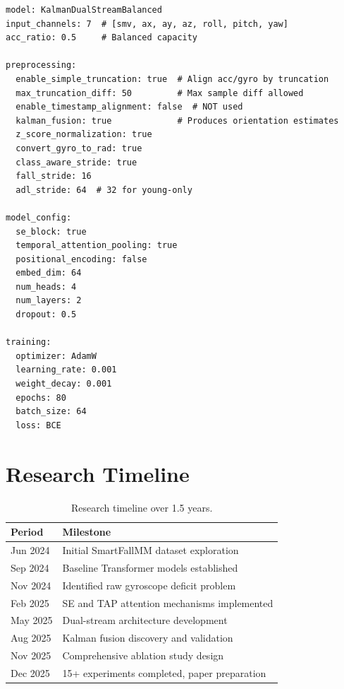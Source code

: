 \documentclass{article}
\begin{document}
\begin{verbatim}
model: KalmanDualStreamBalanced
input_channels: 7  # [smv, ax, ay, az, roll, pitch, yaw]
acc_ratio: 0.5     # Balanced capacity

preprocessing:
  enable_simple_truncation: true  # Align acc/gyro by truncation
  max_truncation_diff: 50         # Max sample diff allowed
  enable_timestamp_alignment: false  # NOT used
  kalman_fusion: true             # Produces orientation estimates
  z_score_normalization: true
  convert_gyro_to_rad: true
  class_aware_stride: true
  fall_stride: 16
  adl_stride: 64  # 32 for young-only

model_config:
  se_block: true
  temporal_attention_pooling: true
  positional_encoding: false
  embed_dim: 64
  num_heads: 4
  num_layers: 2
  dropout: 0.5

training:
  optimizer: AdamW
  learning_rate: 0.001
  weight_decay: 0.001
  epochs: 80
  batch_size: 64
  loss: BCE
\end{verbatim}

\section{Research Timeline}

\begin{table}[htbp]
    \centering
    \caption{Research timeline over 1.5 years.}
    \label{tab:timeline}
    \begin{tabular}{ll}
        \toprule
        \textbf{Period} & \textbf{Milestone} \\
        \midrule
        Jun 2024 & Initial SmartFallMM dataset exploration \\
        Sep 2024 & Baseline Transformer models established \\
        Nov 2024 & Identified raw gyroscope deficit problem \\
        Feb 2025 & SE and TAP attention mechanisms implemented \\
        May 2025 & Dual-stream architecture development \\
        Aug 2025 & Kalman fusion discovery and validation \\
        Nov 2025 & Comprehensive ablation study design \\
        Dec 2025 & 15+ experiments completed, paper preparation \\
        \bottomrule
    \end{tabular}
\end{table}
\end{document}
